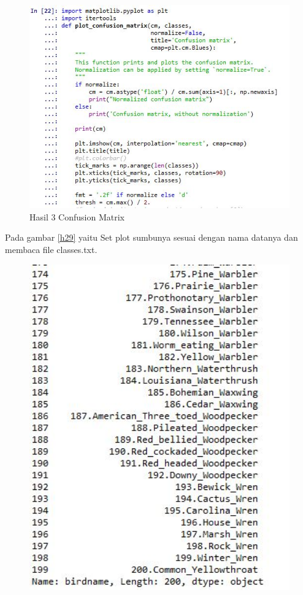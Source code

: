 \begin{enumerate}
\begin{figure}[!htbp]
	\centerline{\includegraphics[width=1\textwidth]{figures/huda/chapter3_praktek/24.JPG}}
	\caption{Hasil 3 Confusion Matrix}
	\label{h28}
\end{figure}
\subitem Pada gambar \ref{h29} yaitu Set plot sumbunya sesuai dengan nama datanya dan membaca file classes.txt.
\begin{figure}[!htbp]
	\centerline{\includegraphics[width=1\textwidth]{figures/huda/chapter3_praktek/25.JPG}}

\end{figure}
\end{enumerate}
